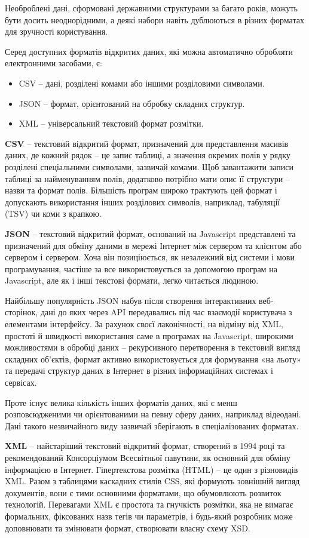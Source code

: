 Необроблені дані, сформовані державними структурами за багато років, можуть бути досить
неоднорідними, а деякі набори навіть дублюються в різних форматах для зручності користування.

Серед доступних форматів відкритих даних, які можна автоматично обробляти
електронними засобами, є:

\begin{itemize}
  \item CSV – дані, розділені комами або іншими розділовими символами.
  \item JSON – формат, орієнтований на обробку складних структур.
  \item XML – універсальний текстовий формат розмітки.
\end{itemize}

\textbf{CSV} – текстовий відкритий формат, призначений для представлення масивів даних, де
кожний рядок – це запис таблиці, а значення окремих полів у рядку розділені спеціальними
символами, зазвичай комами. Щоб завантажити записи таблиці за найменуванням полів, додатково потрібно мати опис її структури –
назви та формат полів.
Більшість програм широко трактують цей формат і допускають використання інших розділових символів,
наприклад, табуляції (TSV) чи коми з крапкою.

\textbf{JSON} – текстовий відкритий формат, оснований на Javascript представлені
та призначений для обміну даними в мережі Інтернет між сервером та
клієнтом або сервером і сервером. Хоча він позиціюється, як незалежний від системи і
мови програмування, частіше за все використовується за допомогою програм на Javascript,
але як і інші текстові формати, легко читається людиною.

Найбільшу популярність JSON набув після створення інтерактивних веб-сторінок, дані до
яких через API передавались під час взаємодії користувача з елементами інтерфейсу.
За рахунок своєї лаконічності, на відміну від XML, простоті й швидкості
використання саме в програмах на Javascript, широкими можливостями в обробці даних
– рекурсивного перетворення в текстовий вигляд складних об'єктів,
формат активно використовується для формування «на льоту»
та передачі структур даних в Інтернет в різних
інформаційних системах і сервісах.

Проте існує велика кількість інших форматів даних, які є менш розповсюдженими чи орієнтованими на певну сферу даних,
наприклад відеодані. Дані такого незвичайного виду зазвичай зберігають в спеціалізованих форматах.

\textbf{XML} – найстаріший текстовий відкритий формат, створений в 1994 році та рекомендований
Консорціумом Всесвітньої павутини, як основний для обміну інформацією в Інтернет.
Гіпертекстова розмітка (HTML) – це один з різновидів XML. Разом з таблицями каскадних
стилів CSS, які формують зовнішній вигляд документів, вони є тими основними форматами,
що обумовлюють розвиток технологій.
Перевагами XML є простота та гнучкість розмітки, яка не вимагає формальних, фіксованих
назв тегів чи параметрів, і будь-який розробник може доповнювати та змінювати формат,
створювати власну схему XSD.

